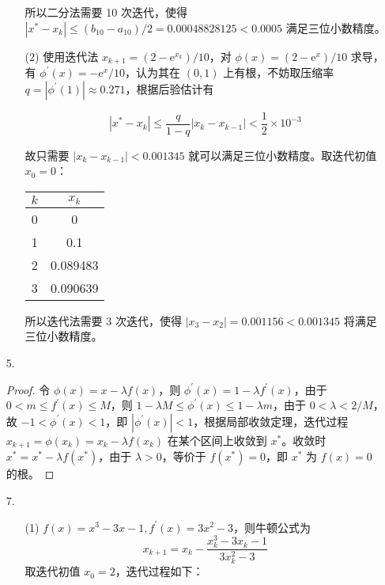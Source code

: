 \documentclass{sjtuarticle}
\begin{document}
\begin{itemize}
\begin{solution}
\begin{enumerate}
    所以二分法需要 10 次迭代，使得$|x^*-x_k|\leq(b_{10}-a_{10})/2=0.00048828125<0.0005$ 满足三位小数精度。
    \item[(2)] 使用迭代法 $x_{k+1}=(2-\mathrm{e}^{x_k})/10$，对 $\phi(x)=(2-\mathrm{e}^{x})/10$ 求导，有 $\phi^\prime(x)=-\mathrm{e}^x/10$，认为其在 $(0,1)$ 上有根，不妨取压缩率 $q=|\phi^\prime(1)|\approx 0.271$，根据后验估计有
    
    \begin{equation*}
        |x^*-x_k|\leq \frac{q}{1-q} |x_k-x_{k-1}|<\frac{1}{2}\times 10^{-3}
    \end{equation*}

    故只需要 $|x_k-x_{k-1}|<0.001345$ 就可以满足三位小数精度。取迭代初值$x_0=0$：
    
    \begin{table}[H]
        \centering
        \begin{tabular}{cc}
            \hline
            $k$ & $x_k$ \\
            \hline
            0 & 0 \\
            1 & 0.1 \\
            2 & 0.089483 \\
            3 & 0.090639 \\
            \hline
        \end{tabular}
    \end{table}

    所以迭代法需要 3 次迭代，使得 $|x_3-x_2|=0.001156<0.001345$ 将满足三位小数精度。

    \end{enumerate}
    \end{solution}
    \item[5.] \begin{proof}
        令 $\phi(x)=x-\lambda f(x)$，则 $\phi^\prime(x)=1-\lambda f^\prime(x)$，由于 $0<m\leq f^\prime (x)\leq M$，则 $1-\lambda M\leq\phi^\prime(x)\leq1-\lambda m$，由于 $0<\lambda<2/M$，故 $-1<\phi^\prime (x)<1$，即 $|\phi^\prime(x)|<1$，根据局部收敛定理，迭代过程 $x_{k+1}=\phi(x_k)=x_k-\lambda f(x_k)$ 在某个区间上收敛到 $x^*$。收敛时 $x^*=x^*-\lambda f(x^*)$，由于 $\lambda>0$，等价于 $f(x^*)=0$，即 $x^*$ 为 $f(x)=0$ 的根。
    \end{proof}
    \item[7.] \begin{solution}
        \begin{itemize}
            \item[(1)] $f(x)=x^3-3x-1, f^\prime(x)=3x^2-3$，则牛顿公式为
            \begin{equation*}
                x_{k+1}=x_k-\frac{x_k^3-3x_k-1}{3x_k^2-3}
            \end{equation*}
            取迭代初值 $x_0=2$，迭代过程如下：
            

\end{itemize}
\end{solution}
\end{itemize}
\end{document}
